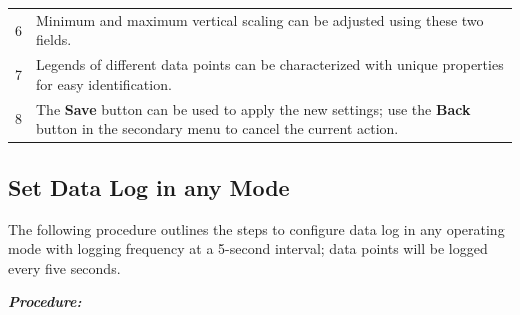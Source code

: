\begin{longtable}[]{@{}ll@{}}
\begin{minipage}[t]{0.26\columnwidth}
6\strut
\end{minipage} & \begin{minipage}[t]{0.68\columnwidth}\raggedright
Minimum and maximum vertical scaling can be adjusted using these two
fields.\strut
\end{minipage}\tabularnewline
\begin{minipage}[t]{0.26\columnwidth}\raggedright
7\strut
\end{minipage} & \begin{minipage}[t]{0.68\columnwidth}\raggedright
Legends of different data points can be characterized with unique
properties for easy identification.\strut
\end{minipage}\tabularnewline
\begin{minipage}[t]{0.26\columnwidth}\raggedright
8\strut
\end{minipage} & \begin{minipage}[t]{0.68\columnwidth}\raggedright
The \textbf{Save} button can be used to apply the new settings; use the
\textbf{Back} button in the secondary menu to cancel the current
action.\strut
\end{minipage}\tabularnewline
\bottomrule
\end{longtable}


\subsection{Set Data Log in any
Mode}

The following procedure outlines the steps to configure data log in any
operating mode with logging frequency at a 5-second interval; data
points will be logged every five seconds.

\emph{\textbf{Procedure:}}


